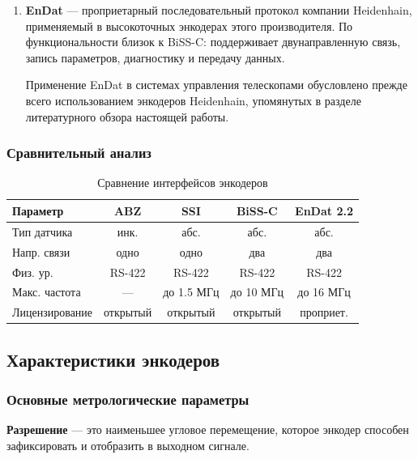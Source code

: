 \begin{enumerate}
\item \textbf{EnDat} --- проприетарный последовательный протокол компании Heidenhain, применяемый в высокоточных энкодерах этого производителя. По функциональности близок к BiSS-C: поддерживает двунаправленную связь, запись параметров, диагностику и передачу данных.

Применение EnDat в системах управления телескопами обусловлено прежде всего использованием энкодеров Heidenhain, упомянутых в разделе литературного обзора настоящей работы.
\end{enumerate}

\subsubsection*{Сравнительный анализ}

\begin{table}[H]
    \centering
    \begin{tabular}{|l|c|c|c|c|}
        \hline
        Параметр & ABZ & SSI & BiSS-C & EnDat 2.2 \\
        \hline
        Тип датчика &
        инк. &
        абс. &
        абс. &
        абс. \\
        \hline
        Напр. связи &
        одно &
        одно &
        два &
        два \\
        \hline
        Физ. ур. &
        RS-422 &
        RS-422 &
        RS-422 &
        RS-422 \\
        \hline
        Макс. частота &
        --- &
        до 1.5 МГц &
        до 10 МГц &
        до 16 МГц \\
        \hline
        Лицензирование &
        открытый &
        открытый &
        открытый &
        проприет. \\
        \hline
    \end{tabular}
    \caption{Сравнение интерфейсов энкодеров}
\end{table}

\subsection{Характеристики энкодеров}

\subsubsection{Основные метрологические параметры}

\textbf{Разрешение} --- это наименьшее угловое перемещение, которое энкодер способен зафиксировать и отобразить в выходном сигнале.


